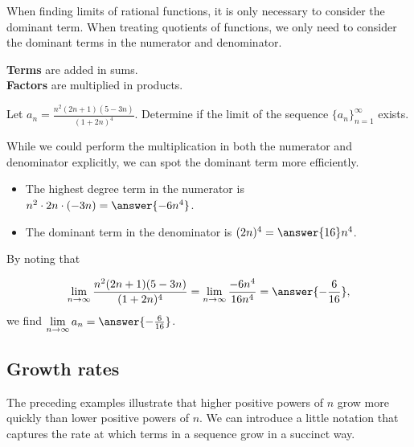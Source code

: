 \documentclass{ximera}
\begin{document}
\begin{remark}
When finding limits of rational functions, it is only necessary to consider the dominant term.  When treating quotients of functions, we only need to consider the dominant terms in the numerator and denominator.
\end{remark}

\begin{remark}
\textbf{\textcolor{purple!85!blue}{Terms}} are added in sums. \\
\textbf{\textcolor{purple!85!blue}{Factors}} are multiplied in products. 
\end{remark}



\begin{example}
Let $a_n = \frac{n^2(2n+1)(5-3n)}{(1+2n)^4}$.  Determine if the limit of the sequence $\{a_n\}_{n=1}^{\infty}$ exists.

\begin{explanation}
While we could perform the multiplication in both the numerator and denominator explicitly, we can spot the dominant term more efficiently.  
\begin{itemize}
\item The highest degree term in the numerator is $n^2 \cdot 2n \cdot (-3n) = \answer{-6n^4}$.
\item The dominant term in the denominator is $(2n)^4 = \answer{16}n^4$.  
\end{itemize}

By noting that 

\[ \lim_{n \to \infty} \frac{n^2(2n+1)(5-3n)}{(1+2n)^4} = \lim_{n \to \infty} \frac{-6n^4}{16n^4} = \answer{-\frac{6}{16}}, \]
we find $\lim\limits_{n \to \infty} a_n = \answer{-\frac{6}{16}}$.
\end{explanation}
\end{example}
 











\subsection{Growth rates}
The preceding examples illustrate that higher positive powers of $n$ grow more quickly than lower positive powers of $n$.  We can introduce a little notation that captures the rate at which terms in a sequence grow in a succinct way.
\end{document}
